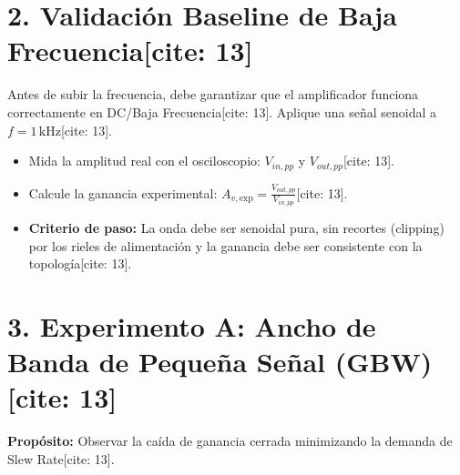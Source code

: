 \documentclass[11pt, a4paper]{article}
\begin{document}
\section*{2. Validación Baseline de Baja Frecuencia[cite: 13]}
Antes de subir la frecuencia, debe garantizar que el amplificador funciona correctamente en DC/Baja Frecuencia[cite: 13]. Aplique una señal senoidal a $f = 1\,\text{kHz}$[cite: 13]. 
\begin{itemize}
    \item Mida la amplitud real con el osciloscopio: $V_{in,pp}$ y $V_{out,pp}$[cite: 13].
    \item Calcule la ganancia experimental: $A_{v,\mathrm{exp}} = \frac{V_{out,pp}}{V_{in,pp}}$[cite: 13].
    \item \textbf{Criterio de paso:} La onda debe ser senoidal pura, sin recortes (clipping) por los rieles de alimentación y la ganancia debe ser consistente con la topología[cite: 13].
\end{itemize}

\section*{3. Experimento A: Ancho de Banda de Pequeña Señal (GBW)[cite: 13]}
\textbf{Propósito:} Observar la caída de ganancia cerrada minimizando la demanda de Slew Rate[cite: 13].
\end{document}
